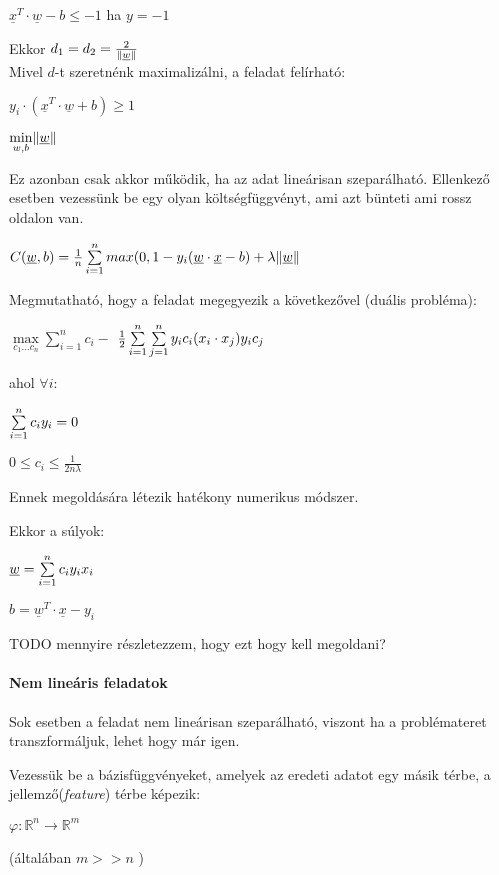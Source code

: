 $ \underline{x}^T \cdot \underline{w} - b \leq -1 $ ha $  y=-1 $

Ekkor $ d_1 = d_2 = \frac{2}{\lVert\underline{w}\rVert} $  
\\
Mivel $ d $-t szeretnénk maximalizálni, a feladat felírható:

$ y_i \cdot (\underline{x}^T \cdot \underline{w} + b) \geq 1 $

$ \min\limits_{w, b} \lVert\underline{w}\rVert $

Ez azonban csak akkor működik, ha az adat lineárisan szeparálható. Ellenkező esetben
vezessünk be egy olyan költségfüggvényt, ami azt bünteti ami rossz oldalon van.

$ C(\underline{w},b)  = \frac{1}{n} \sum\limits_{i=1}^{n} 
max(0, 1 - y_i(\underline{w} \cdot \underline{x} - b) + \lambda \lVert\underline{w}\rVert $



\noindent
Megmutatható, hogy a feladat megegyezik a következővel (duális probléma): 

$ \max\limits_{c_1 \dots c_n} \sum\limits_{i=1}^{n}c_i -  $
$ \frac{1}{2}\sum\limits_{{i}=1}^{n}\sum\limits_{{j}=1}^{n} y_i c_i (x_i \cdot x_j) y_i c_j $

\noindent
ahol $ \forall i: $

$  \sum\limits_{{i}=1}^{n} c_i y_i = 0 $

$ 0 \leq c_i \leq \frac{1}{2n\lambda} $

\noindent
Ennek megoldására létezik hatékony numerikus módszer.

\noindent
Ekkor a súlyok:

$ \underline{w} = \sum\limits_{{i}=1}^{n} c_i y_i x_i $

$ b = \underline{w}^T \cdot \underline{x}  - y_i$

\noindent
TODO mennyire részletezzem, hogy ezt hogy kell megoldani?




\paragraph{Nem lineáris feladatok} 


Sok esetben a feladat nem lineárisan szeparálható, viszont ha a problémateret
transzformáljuk, lehet hogy már igen. 

Vezessük be a bázisfüggvényeket, amelyek az eredeti adatot egy másik térbe,
a jellemző(\textit{feature}) térbe képezik:


$ \varphi : \mathbb{R}^n \rightarrow \mathbb{R}^m $

(általában $ m >> n $ )


